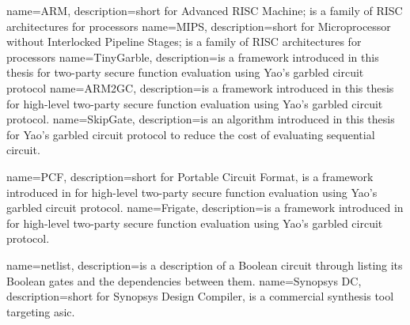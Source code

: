 {
  name=ARM,
  description={short for Advanced RISC Machine; is a family of RISC architectures for processors}
}
{
  name=MIPS,
  description={short for Microprocessor without Interlocked Pipeline Stages; is a family of RISC architectures for processors}
}
{
  name=TinyGarble,
  description={is a framework introduced in this thesis for two-party secure function evaluation using Yao's garbled circuit protocol}
}
{
  name=ARM2GC,
  description={is a framework introduced in this thesis for high-level two-party secure function evaluation using Yao's garbled circuit protocol.}
}
{
  name=SkipGate,
  description={is an algorithm introduced in this thesis for Yao's garbled circuit protocol to reduce the cost of evaluating sequential circuit.}
}

{
  name=PCF,
  description={short for Portable Circuit Format, is a framework introduced in \cite{kreuter2013pcf} for high-level two-party secure function evaluation using Yao's garbled circuit protocol.}
}
{
  name=Frigate,
  description={is a framework introduced in \cite{mood2016frigate} for high-level two-party secure function evaluation using Yao's garbled circuit protocol.}
}

{
  name=netlist,
  description={is a description of a Boolean circuit through listing its Boolean gates and the dependencies between them.}
}
{
  name=Synopsys DC,
  description={short for Synopsys Design Compiler, is a commercial synthesis tool targeting \acrfull{asic}.}
}
